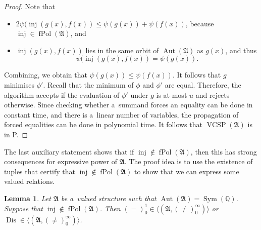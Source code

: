 \documentclass[preprint,12pt]{elsarticle}
\newcommand{\Q}{\mathbb Q}
\newcommand{\bA}{{\mathfrak A}}
\newcommand{\checked}[1]{#1}
\DeclareMathOperator{\Aut}{Aut}
\DeclareMathOperator{\fPol}{fPol}
\DeclareMathOperator{\vcsp}{VCSP}
\DeclareMathOperator{\Sym}{Sym}
\DeclareMathOperator{\inj}{inj}
\DeclareMathOperator{\Dis}{Dis}
\newtheorem{lemma}[theorem]{Lemma}
\begin{document}
\begin{proof}
Note that
\begin{itemize}
\item 
$2 \psi(\inj(g(x),f(x)) \leq \psi(g(x)) + \psi(f(x))$, because $\inj \in \fPol(\bA)$, and 
\item $\inj(g(x),f(x))$ lies in the same orbit of $\Aut(\bA)$ as $g(x)$, and thus
$$\psi(\inj(g(x),f(x)) = \psi(g(x)).$$
\end{itemize}
Combining, we obtain 
that 
$\psi(g(x)) \leq \psi(f(x))$. 
It follows that $g$ minimises $\phi'$.
Recall that the minimum of $\phi$ and $\phi'$ are equal. Therefore, the algorithm accepts if the evaluation of $\phi'$ under $g$ is at most $u$ and rejects otherwise.
Since checking whether a~summand forces an equality can be done in constant time, and there is a~linear number of variables, the propagation of forced equalities can be done in polynomial time.
It follows that $\vcsp(\bA)$ is in P. 
\end{proof} 

\checked{The last auxiliary statement shows that if $\inj \notin \fPol(\bA)$, then this has strong consequences for expressive power of $\bA$. The proof idea is to use the existence of tuples that certify that $\inj \notin \fPol(\bA)$ to show that we can express some valued relations.}

\begin{lemma}\label{lem:no-r}
Let $\bA$ be a~valued structure such that $\Aut(\bA) = \Sym(\Q)$.
Suppose that $\inj \notin \fPol(\bA)$.
Then $(=)^1_0 \in \langle (\bA,(\neq)_0^\infty) \rangle$ or $\Dis \in \langle (\bA,(\neq)_0^\infty) \rangle$. 
\end{lemma}
\end{document}
